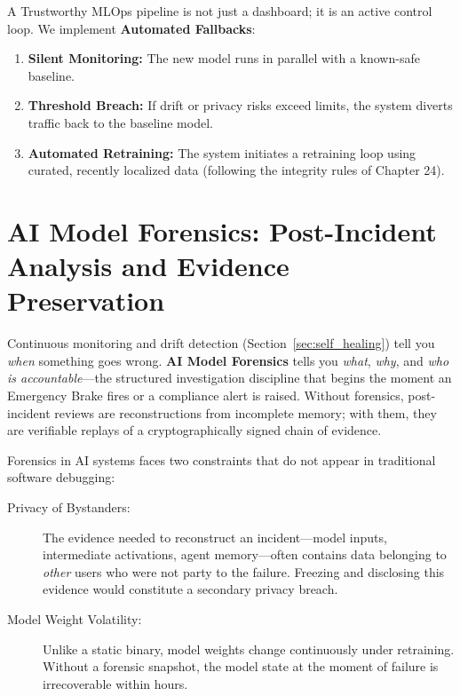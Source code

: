 A Trustworthy MLOps pipeline is not just a dashboard; it is an active control loop. We implement \textbf{Automated Fallbacks}:
\begin{enumerate}
    \item \textbf{Silent Monitoring:} The new model runs in parallel with a known-safe baseline.
    \item \textbf{Threshold Breach:} If drift or privacy risks exceed limits, the system diverts traffic back to the baseline model.
    \item \textbf{Automated Retraining:} The system initiates a retraining loop using curated, recently localized data (following the integrity rules of Chapter 24).
\end{enumerate}

\section{AI Model Forensics: Post-Incident Analysis and Evidence Preservation}
\label{sec:model_forensics}

Continuous monitoring and drift detection (Section~\ref{sec:self_healing}) tell you \emph{when} something goes wrong. \textbf{AI Model Forensics} tells you \emph{what}, \emph{why}, and \emph{who is accountable}---the structured investigation discipline that begins the moment an Emergency Brake fires or a compliance alert is raised. Without forensics, post-incident reviews are reconstructions from incomplete memory; with them, they are verifiable replays of a cryptographically signed chain of evidence.

Forensics in AI systems faces two constraints that do not appear in traditional software debugging:

\begin{description}
  \item[Privacy of Bystanders:] The evidence needed to reconstruct an incident---model inputs, intermediate activations, agent memory---often contains data belonging to \emph{other} users who were not party to the failure. Freezing and disclosing this evidence would constitute a secondary privacy breach.
  \item[Model Weight Volatility:] Unlike a static binary, model weights change continuously under retraining. Without a forensic snapshot, the model state at the moment of failure is irrecoverable within hours.
\end{description}

